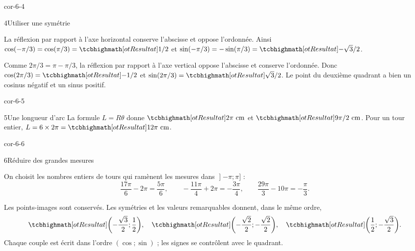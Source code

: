 \begin{blocLivre}{cor-6-4}
\begin{corrige}{4}{Utiliser une symétrie}
\begin{questions}
\item La réflexion par rapport à l’axe horizontal conserve l’abscisse et oppose l’ordonnée.
Ainsi $\cos(-\pi/3)=\cos(\pi/3)=\res{1/2}$ et
$\sin(-\pi/3)=-\sin(\pi/3)=\res{-\sqrt3/2}$.
\item Comme $2\pi/3=\pi-\pi/3$, la réflexion par rapport à l’axe vertical oppose l’abscisse et conserve l’ordonnée.
Donc $\cos(2\pi/3)=\res{-1/2}$ et $\sin(2\pi/3)=\res{\sqrt3/2}$.
Le point du deuxième quadrant a bien un cosinus négatif et un sinus positif.
\end{questions}

\label{figlivre-r06-04-symetries-cor}

\end{corrige}
\end{blocLivre}
\begin{blocLivre}{cor-6-5}
\begin{corrige}{5}{Une longueur d'arc}
La formule $L=R\theta$ donne $\res{2\pi\text{ cm}}$ et $\res{9\pi/2\text{ cm}}$. Pour un tour entier, $L=6\times2\pi=\res{12\pi\text{ cm}}$.
\label{figlivre-r06-05-arcs-cor}

\end{corrige}
\end{blocLivre}
\begin{blocLivre}{cor-6-6}
\begin{corrige}{6}{Réduire des grandes mesures}
\begin{questions}
\item On choisit les nombres entiers de tours qui ramènent les mesures dans $\mathopen{]}-\pi;\pi]$ :
\[\frac{17\pi}6-2\pi=\frac{5\pi}6,\qquad
-\frac{11\pi}4+2\pi=-\frac{3\pi}4,\qquad
\frac{29\pi}3-10\pi=-\frac\pi3.\]
\item Les points-images sont conservés. Les symétries et les valeurs remarquables donnent, dans le même ordre,
\[\res{\left(-\frac{\sqrt3}2;\frac12\right)},\quad
\res{\left(-\frac{\sqrt2}2;-\frac{\sqrt2}2\right)},\quad
\res{\left(\frac12;-\frac{\sqrt3}2\right)}.\]
Chaque couple est écrit dans l’ordre $(\cos;\sin)$ ; les signes se contrôlent avec le quadrant.
\end{questions}

\end{corrige}
\end{blocLivre}
